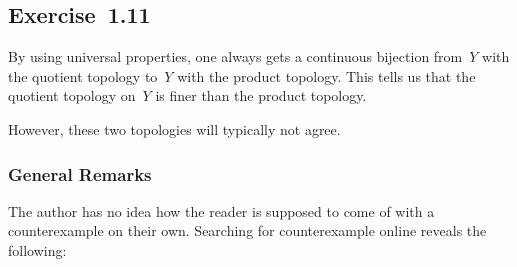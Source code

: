 \subsection{Exercise~1.11}

By using universal properties, one always gets a continuous bijection from~$Y$ with the quotient topology to~$Y$ with the product topology.
This tells us that the quotient topology on~$Y$ is finer than the product topology.

However, these two topologies will typically not agree.



\subsubsection{General Remarks}

The author has no idea how the reader is supposed to come of with a counterexample on their own.
Searching for counterexample online reveals the following:

